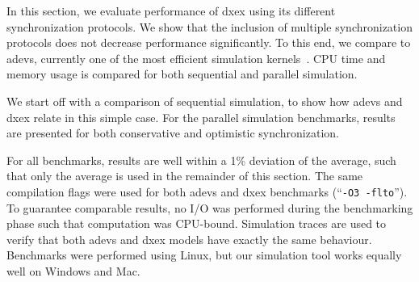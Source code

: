In this section, we evaluate performance of dxex using its different synchronization protocols.
We show that the inclusion of multiple synchronization protocols does not decrease performance significantly.
To this end, we compare to adevs, currently one of the most efficient simulation kernels~\cite{DEVSSurvey}.
CPU time and memory usage is compared for both sequential and parallel simulation.

We start off with a comparison of sequential simulation, to show how adevs and dxex relate in this simple case.
For the parallel simulation benchmarks, results are presented for both conservative and optimistic synchronization.

For all benchmarks, results are well within a 1\% deviation of the average, such that only the average is used in the remainder of this section.
The same compilation flags were used for both adevs and dxex benchmarks (``\texttt{-O3 -flto}'').
To guarantee comparable results, no I/O was performed during the benchmarking phase such that computation was CPU-bound.
Simulation traces are used to verify that both adevs and dxex models have exactly the same behaviour.
Benchmarks were performed using Linux, but our simulation tool works equally well on Windows and Mac.

